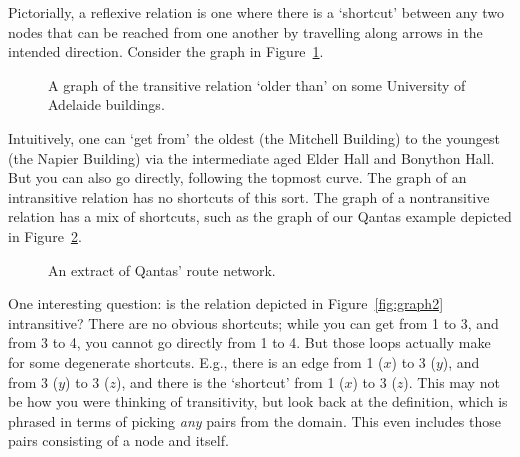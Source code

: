 \begin{earg}
Pictorially, a reflexive relation is one where there is a `shortcut' between any two nodes that can be reached from one another by travelling along arrows in the intended direction. Consider the graph in Figure~\ref{fig:trans}. 
\begin{figure}[t]
	\caption{A graph of the transitive relation `older than' on some University of Adelaide buildings.\label{fig:trans}}
\end{figure} Intuitively, one can `get from' the oldest (the Mitchell Building) to the youngest (the Napier Building) via the intermediate aged Elder Hall and Bonython Hall. But you can also go directly, following the topmost curve. The graph of an intransitive relation has no shortcuts of this sort. The graph of a nontransitive relation has a mix of shortcuts, such as the graph of our Qantas example depicted in Figure~\ref{fig:qantas}. 
\begin{figure}[b]
	\caption{An extract of Qantas' route network.\label{fig:qantas}}
\end{figure}

One interesting question: is the relation depicted in Figure~\ref{fig:graph2} intransitive? There are no obvious shortcuts; while you can get from 1 to 3, and from 3 to 4, you cannot go directly from 1 to 4. But those loops actually make for some degenerate shortcuts. E.g., there is an edge from 1 ($x$) to 3 ($y$), and from 3 ($y$) to 3 ($z$), and there is the `shortcut' from 1 ($x$) to 3 ($z$). This may not be how you were thinking of transitivity, but look back at the definition, which is phrased in terms of picking \emph{any} pairs from the domain. This even includes those pairs consisting of a node and itself.


\end{earg}
